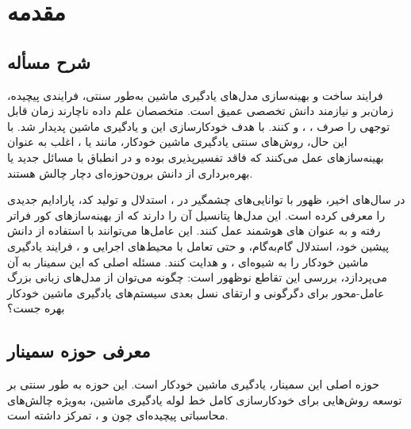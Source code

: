 
\chapter{مقدمه}
\thispagestyle{empty}

\section{شرح مسأله}
فرایند ساخت و بهینه‌سازی مدل‌های یادگیری ماشین به‌طور سنتی، فرایندی پیچیده، زمان‌بر و نیازمند دانش تخصصی عمیق است. متخصصان علم داده ناچارند زمان قابل توجهی را صرف ، ، و  کنند.  با هدف خودکارسازی این  و  یادگیری ماشین پدیدار شد. با این حال، روش‌های سنتی یادگیری ماشین خودکار، مانند  یا ، اغلب به عنوان  بهینه‌سازهای  عمل می‌کنند که فاقد تفسیرپذیری بوده و در انطباق با مسائل جدید یا بهره‌برداری از دانش برون‌حوزه‌ای دچار چالش هستند.

در سال‌های اخیر، ظهور  با توانایی‌های چشمگیر در ، استدلال و تولید کد، پارادایم جدیدی را معرفی کرده است. این مدل‌ها پتانسیل آن را دارند که از بهینه‌سازهای کور فراتر رفته و به عنوان های هوشمند عمل کنند. این عامل‌ها می‌توانند با استفاده از دانش پیشین خود، استدلال گام‌به‌گام، و حتی تعامل با محیط‌های اجرایی و ، فرایند یادگیری ماشین خودکار را به شیوه‌ای ،  و  هدایت کنند. مسئله اصلی که این سمینار به آن می‌پردازد، بررسی این تقاطع نوظهور است: چگونه می‌توان از مدل‌های زبانی بزرگ عامل-محور برای دگرگونی و ارتقای نسل بعدی سیستم‌های یادگیری ماشین خودکار بهره جست؟

\section{معرفی حوزه سمینار}
 حوزه اصلی این سمینار، یادگیری ماشین خودکار است. این حوزه به طور سنتی بر توسعه روش‌هایی برای خودکارسازی کامل خط لوله یادگیری ماشین، به‌ویژه چالش‌های محاسباتی پیچیده‌ای چون  و ، تمرکز داشته است.

